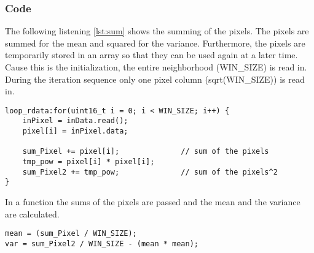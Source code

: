 \subsubsection*{Code}
The following listening \ref{lst:sum} shows the summing of the pixels. The pixels are summed for the mean and squared for the variance. Furthermore, the pixels are temporarily stored in an array so that they can be used again at a later time. \\
Cause this is the initialization, the entire neighborhood (WIN\_SIZE) is read in. During the iteration sequence only one pixel column (sqrt(WIN\_SIZE)) is read in. \\
\begin{minipage}{\textwidth}
\begin{lstlisting}[style=CStyle, caption=Calculation of the sum, label=lst:sum]
loop_rdata:for(uint16_t i = 0; i < WIN_SIZE; i++) {
	inPixel = inData.read();
	pixel[i] = inPixel.data;

	sum_Pixel += pixel[i];				// sum of the pixels
	tmp_pow = pixel[i] * pixel[i];
	sum_Pixel2 += tmp_pow;				// sum of the pixels^2
}
\end{lstlisting}
\end{minipage}

In a function the sums of the pixels are passed and the mean and the variance are calculated. \\
\begin{minipage}{\textwidth}
\begin{lstlisting}[style=CStyle, caption=Calculation of the mean and variance, label=lst:mean_var]
mean = (sum_Pixel / WIN_SIZE);
var = sum_Pixel2 / WIN_SIZE - (mean * mean);
\end{lstlisting}
\end{minipage}


